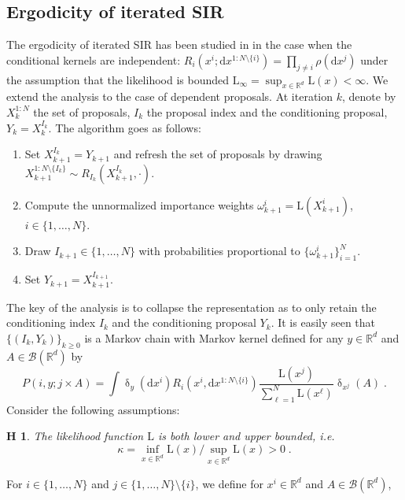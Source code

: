 \documentclass{article}
\newtheorem{assumption}{\textbf{H}\hspace{-3pt}}
\def\rmd{\operatorname{d}\hspace{-2pt}}
\def\rset{\mathbb{R}}
\def\rmd{\mathrm{d}}
\def\eqsp{\,}
\def\borel{\mathcal{B}}
\def\ie{\textit{i.e.}}
\def\eqsp{\;}
\newcommand{\1}{\mathds{1}}
\def\proposal{\rho}
\newcommand{\chunku}[3]{#1^{#2:#3}}
\newcommand{\chunkum}[4]{#1^{#2:#3 \setminus \{#4\}}}
\def\rset{\mathbb{R}}
\def\rmd{\mathrm{d}}
\def\likelihood{\mathrm{L}}
\def\likeratio{\kappa}
\begin{document}
\subsection{Ergodicity of iterated SIR}
\label{sup:sec:ergodicity}
The ergodicity of iterated SIR has been studied in \cite{andrieu2018uniform} in the case when the conditional kernels are independent: $R_i(x^i; \rmd \chunkum{x}{1}{N}{i})= \prod_{j \neq i} \proposal(\rmd x^j)$ under the assumption that the likelihood is bounded $\likelihood_\infty= \sup_{x \in \rset^d} \likelihood(x) < \infty$. We extend the analysis to the case of dependent proposals. At iteration $k$, denote by $\chunku{X_k}{1}{N}$ the set of proposals, $I_k$ the proposal index and the conditioning proposal, $Y_k=X_k^{I_k}$. The algorithm goes as follows:
\begin{enumerate}
\item Set $X_{k+1}^{I_k}= Y_{k+1}$ and refresh the set of proposals by drawing $\chunkum{X_{k+1}}{1}{N}{I_k} \sim R_{I_k}(X_{k+1}^{I_k},\cdot)$.
\item Compute the unnormalized importance weights $\omega_{k+1}^i= \likelihood(X_{k+1}^i)$, $i \in \{1,\dots,N\}$.
\item Draw $I_{k+1} \in \{1,\dots,N\}$ with probabilities proportional to $\{\omega_{k+1}^i \}_{i=1}^N$.
\item Set $Y_{k+1}= X_{k+1}^{I_{k+1}}$.
\end{enumerate}
The key of the analysis is to collapse the representation as to  only retain the conditioning index $I_k$ and the conditioning proposal $Y_k$. It is easily seen that $\{(I_k,Y_k) \}_{k \geq 0}$ is a Markov chain with Markov kernel defined for any $y \in \rset^d$ and $A \in \borel(\rset^d)$ by
\begin{equation}
\label{eq:kernel-marginal}
P(i,y; j \times A)=  \int \updelta_y(\rmd x^i) R_i(x^i, \rmd \chunkum{x}{1}{N}{i}) \frac{\likelihood(x^j)}{\sum_{\ell=1}^N \likelihood(x^\ell)} \updelta_{x^j}(A) \eqsp.
\end{equation}
Consider the following assumptions:
\begin{assumption}
\label{assum:likelihood-bounded}
The likelihood function $\likelihood$ is both lower and upper bounded, \ie\
\begin{equation}
\label{eq:definition-rho}
\likeratio= \inf_{x \in \rset^d} \likelihood(x) \big/ \sup_{x \in \rset^d} \likelihood(x) > 0 \eqsp.
\end{equation}
\end{assumption}
For $i \in \{1,\dots,N\}$ and $j \in \{1,\dots,N\} \setminus \{i\}$, we define for $x^i \in \rset^d$ and $A \in \borel(\rset^d)$,
\end{document}

